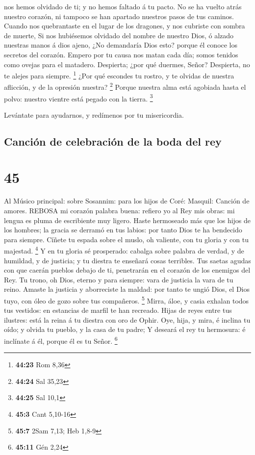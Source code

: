 nos hemos olvidado de ti; y no hemos faltado á tu pacto. 
No se ha vuelto atrás nuestro corazón, ni tampoco se han apartado
nuestros pasos de tus caminos.  Cuando nos quebrantaste en
el lugar de los dragones, y nos cubriste con sombra de muerte,
 Si nos hubiésemos olvidado del nombre de nuestro Dios, ó
alzado nuestras manos á dios ajeno,  ¿No demandaría Dios
esto? porque él conoce los secretos del corazón.  Empero
por tu causa nos matan cada día; somos tenidos como ovejas para el
matadero.  Despierta; ¿por qué duermes, Señor? Despierta,
no te alejes para siempre. \footnote{\textbf{44:23} Rom 8,36}
 ¿Por qué escondes tu rostro, y te olvidas de nuestra
aflicción, y de la opresión nuestra? \footnote{\textbf{44:24} Sal 35,23}
 Porque nuestra alma está agobiada hasta el polvo: nuestro
vientre está pegado con la tierra. \footnote{\textbf{44:25} Sal 10,1}

 Levántate para ayudarnos, y redímenos por tu misericordia.

\hypertarget{canciuxf3n-de-celebraciuxf3n-de-la-boda-del-rey}{%
\subsection{Canción de celebración de la boda del
rey}\label{canciuxf3n-de-celebraciuxf3n-de-la-boda-del-rey}}

\hypertarget{section-44}{%
\section{45}\label{section-44}}

 Al Músico principal: sobre Sosannim: para los hijos de
Coré: Masquil: Canción de amores. REBOSA mi corazón palabra buena:
refiero yo al Rey mis obras: mi lengua es pluma de escribiente muy
ligero.  Haste hermoseado más que los hijos de los hombres;
la gracia se derramó en tus labios: por tanto Dios te ha bendecido para
siempre.  Cíñete tu espada sobre el muslo, oh valiente, con
tu gloria y con tu majestad. \footnote{\textbf{45:3} Cant 5,10-16}
 Y en tu gloria sé prosperado: cabalga sobre palabra de
verdad, y de humildad, y de justicia; y tu diestra te enseñará cosas
terribles.  Tus saetas agudas con que caerán pueblos debajo
de ti, penetrarán en el corazón de los enemigos del Rey.  Tu
trono, oh Dios, eterno y para siempre: vara de justicia la vara de tu
reino.  Amaste la justicia y aborreciste la maldad: por
tanto te ungió Dios, el Dios tuyo, con óleo de gozo sobre tus
compañeros. \footnote{\textbf{45:7} 2Sam 7,13; Heb 1,8-9} 
Mirra, áloe, y casia exhalan todos tus vestidos: en estancias de marfil
te han recreado.  Hijas de reyes entre tus ilustres: está la
reina á tu diestra con oro de Ophir.  Oye, hija, y mira, é
inclina tu oído; y olvida tu pueblo, y la casa de tu padre;
 Y deseará el rey tu hermosura: é inclínate á él, porque él
es tu Señor. \footnote{\textbf{45:11} Gén 2,24}

